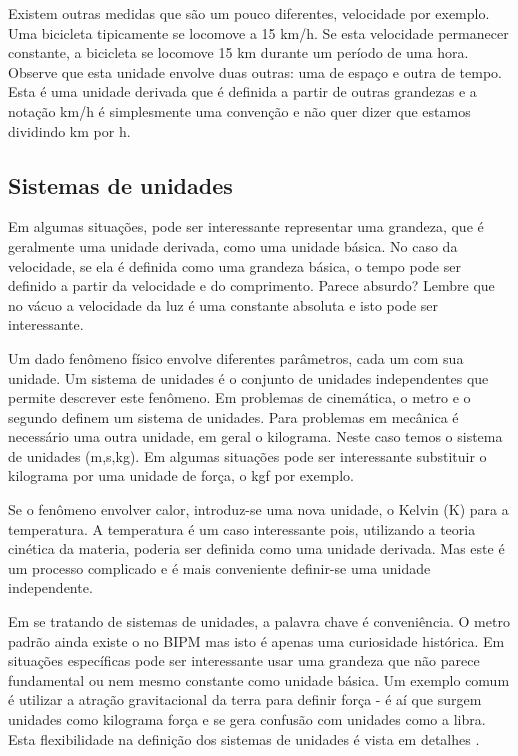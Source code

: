Existem outras medidas que são um pouco diferentes, velocidade por exemplo. Uma bicicleta tipicamente se locomove a 15 km/h. Se esta velocidade permanecer constante, a bicicleta se locomove 15 km durante um período de uma hora. Observe que esta unidade envolve duas outras: uma de espaço e outra de tempo. Esta é uma unidade derivada que é definida a partir de outras grandezas e a notação km/h é simplesmente uma convenção e não quer dizer que estamos dividindo km por h.

\subsection{Sistemas de unidades}

Em algumas situações, pode ser interessante representar uma grandeza, que é geralmente uma unidade derivada, como uma unidade básica. No caso da velocidade, se ela é definida como uma grandeza básica, o tempo pode ser definido a partir da velocidade e do comprimento. Parece absurdo? Lembre que no vácuo a velocidade da luz é uma constante absoluta e isto pode ser interessante.

Um dado fenômeno físico envolve diferentes parâmetros, cada um com sua unidade. Um sistema de unidades é o conjunto de unidades independentes que permite descrever este fenômeno. Em problemas de cinemática, o metro e o segundo definem um sistema de unidades. Para problemas em mecânica é necessário uma outra unidade, em geral o kilograma. Neste caso temos o sistema de unidades (m,s,kg). Em algumas situações pode ser interessante substituir o kilograma por uma unidade de força, o kgf por exemplo.

Se o fenômeno envolver calor, introduz-se uma nova unidade, o Kelvin (K) para a temperatura. A temperatura é um caso interessante pois, utilizando a teoria cinética da materia, poderia ser definida como uma unidade derivada. Mas este é um processo complicado e é mais conveniente definir-se uma unidade independente.

Em se tratando de sistemas de unidades, a palavra chave é conveniência. O metro padrão ainda existe o no BIPM mas isto é apenas uma curiosidade histórica. Em situações específicas pode ser interessante usar uma grandeza que não parece fundamental ou nem mesmo constante como unidade básica. Um exemplo comum é utilizar a atração gravitacional da terra para definir força - é aí que surgem unidades como kilograma força e se gera confusão com unidades como a libra. Esta flexibilidade na definição dos sistemas de unidades é vista em detalhes .

